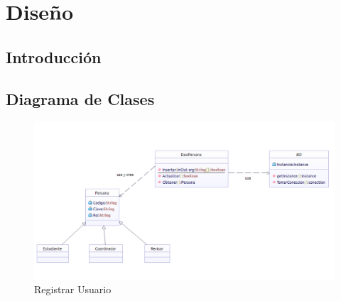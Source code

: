 \chapter{Diseño}

\section{Introducción}

\newpage



\section{Diagrama de Clases}

\begin{figure}[th!]
	\centering
	\includegraphics[width=1.2\linewidth]{uml/Clases/ClasesCrearUsuario}
	\caption{Registrar Usuario}
	\label{fig:Registrar Usuario}
\end{figure}

\newpage




